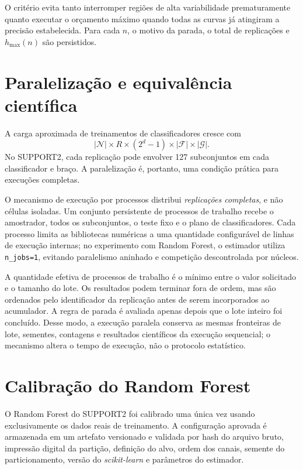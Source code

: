 O critério evita tanto interromper regiões de alta variabilidade prematuramente quanto executar o orçamento máximo quando todas as curvas já atingiram a precisão estabelecida. Para cada $n$, o motivo da parada, o total de replicações e $h_{\max}(n)$ são persistidos.

\section{Paralelização e equivalência científica}

A carga aproximada de treinamentos de classificadores cresce com
\begin{equation}
  |\mathcal{N}|\times R\times(2^d-1)\times|\mathcal{F}|\times|\mathcal{G}|.
  \label{eq:computational-load}
\end{equation}
No SUPPORT2, cada replicação pode envolver 127 subconjuntos em cada classificador e braço. A paralelização é, portanto, uma condição prática para execuções completas.

O mecanismo de execução por processos distribui \emph{replicações completas}, e não células isoladas. Um conjunto persistente de processos de trabalho recebe o amostrador, todos os subconjuntos, o teste fixo e o plano de classificadores. Cada processo limita as bibliotecas numéricas a uma quantidade configurável de linhas de execução internas; no experimento com Random Forest, o estimador utiliza \texttt{n\_jobs=1}, evitando paralelismo aninhado e competição descontrolada por núcleos.

A quantidade efetiva de processos de trabalho é o mínimo entre o valor solicitado e o tamanho do lote. Os resultados podem terminar fora de ordem, mas são ordenados pelo identificador da replicação antes de serem incorporados ao acumulador. A regra de parada é avaliada apenas depois que o lote inteiro foi concluído. Desse modo, a execução paralela conserva as mesmas fronteiras de lote, sementes, contagens e resultados científicos da execução sequencial; o mecanismo altera o tempo de execução, não o protocolo estatístico.

\section{Calibração do Random Forest}

O Random Forest do SUPPORT2 foi calibrado uma única vez usando exclusivamente os dados reais de treinamento. A configuração aprovada é armazenada em um artefato versionado e validada por hash do arquivo bruto, impressão digital da partição, definição do alvo, ordem dos canais, semente do particionamento, versão do \textit{scikit-learn} e parâmetros do estimador.


